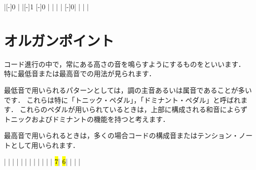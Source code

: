 \documentclass[dvipdfmx,uplatex,b5paper,openany,jbase=12Q,nomag*,textwidth-limit=44%
               ]{gachimuchi}[2020/05/05]
\begin{document}
\begin{Music}
  \generalmeter{\meterC}%
  \Startpiece
  \NOTes%
  |[-\QNwidth]{0}%
  \en\bar%
  \NOTes%
  |[-\QNwidth]{1}%
  \en\doublebar%
  \NOTes%
  [-\QNwidth]{0}%
  |%
  \en\bar%
  \NOTes%
  |%
  \en\doublebar%
  \NOTes%
  |%
  \en%
  \NOTes%
  [-\QNwidth]{0}|%
  \en%
  \bar%
  \NOTes%
  |%
  \en%
  \NOTes%
  |%
  \en\setdoublebar%
  \endpiece
\end{Music}

\section{オルガンポイント}
コード進行の中で，常にある高さの音を鳴らすようにするものをといいます．
特に最低音または最高音での用法が見られます．

最低音で用いられるパターンとしては，調の主音あるいは属音であることが多いです．
これらは特に「トニック・ペダル」，「ドミナント・ペダル」と呼ばれます．
これらのペダルが用いられているときは，上部に構成される和音によらずトニックおよびドミナントの機能を持つと考えます．

最高音で用いられるときは，多くの場合コードの構成音またはテンション・ノートとして用いられます．

\begin{Music}[0.95\linewidth]
  \generalmeter{\meterC}%
  \Startpiece
  \NOTes%
  |%
  \en%
  \NOTes%
  |%
  \en\bar%
  \NOTes%
  |%
  \en%
  \NOTes%
  |%
  \en\bar%
  \NOTEs%
  |%
  \en\doublebar%
  \NOTes%
  |%
  \en%
  \NOTes%
  |%
  \en\bar%
  \NOTes%
  |%
  \en%
  \NOTes%
  |%
  \en%
  \doublebar%
  \NOTes%
  \hl{7}|%
  \en%
  \NOTes%
  \hl{6}|%
  \en%
  \bar%
  \NOTes%
  |%
  \en%
  \NOTes%
  |%
  \en\setdoublebar%
  \endpiece
\end{Music}
\end{document}
